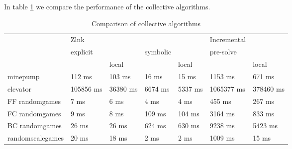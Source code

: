 In table \ref{tab_compare_collective_algs} we compare the performance of the collective algorithms.
\begin{table}[h]
	\centering
	\begin{tabular}{|l|l|l|l|l|l|l|}
		\hline
		& Zlnk& & & & Incremental& \\
		& explicit & & symbolic & & pre-solve &
		\\
		&  & local & & local & & local
		\\ \hline
		minepump& 112 ms& 103 ms& 16 ms& 15 ms& 1153 ms& 671 ms\\ \hline
		elevator& 105856 ms& 36380 ms& 6674 ms& 5337 ms& 1065377 ms& 378460 ms\\ \hline
		FF randomgames& 7 ms& 6 ms& 4 ms& 4 ms& 455 ms& 267 ms\\ \hline
		FC randomgames& 9 ms& 8 ms& 109 ms& 104 ms& 3164 ms& 833 ms\\ \hline
		BC randomgames& 26 ms& 26 ms& 624 ms& 630 ms& 9238 ms& 5423 ms\\ \hline
		randomscalegames& 20 ms& 18 ms& 2 ms& 2 ms& 1009 ms& 15 ms\\ \hline
	\end{tabular}
	\caption{Comparison of collective algorithms}
	\label{tab_compare_collective_algs}
\end{table}